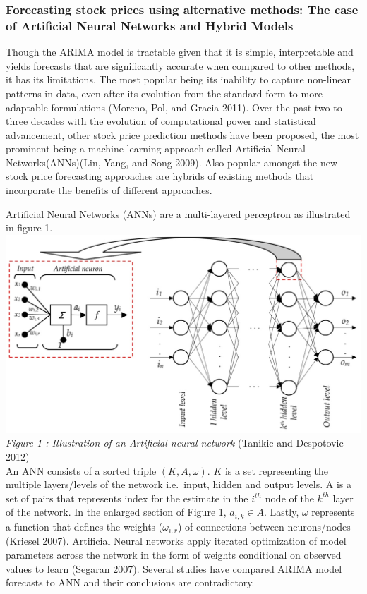 \documentclass[12pt,a4paper]{article}
\numberwithin{equation}{section}
\numberwithin{figure}{section}
\numberwithin{table}{section}
\begin{document}
\subsubsection{Forecasting stock prices using alternative methods: The
case of Artificial Neural Networks and Hybrid
Models}\label{forecasting-stock-prices-using-alternative-methods-the-case-of-artificial-neural-networks-and-hybrid-models}

Though the ARIMA model is tractable given that it is simple,
interpretable and yields forecasts that are significantly accurate when
compared to other methods, it has its limitations. The most popular
being its inability to capture non-linear patterns in data, even after
its evolution from the standard form to more adaptable formulations
(Moreno, Pol, and Gracia 2011). Over the past two to three decades with
the evolution of computational power and statistical advancement, other
stock price prediction methods have been proposed, the most prominent
being a machine learning approach called Artificial Neural
Networks(ANNs)(Lin, Yang, and Song 2009). Also popular amongst the new
stock price forecasting approaches are hybrids of existing methods that
incorporate the benefits of different approaches.

Artificial Neural Networks (ANNs) are a multi-layered perceptron as
illustrated in figure 1.\\
\includegraphics{ANN.png}\\
\emph{Figure 1 : Illustration of an Artificial neural network} (Tanikic
and Despotovic 2012)\\
An ANN consists of a sorted triple \((K, A, \omega)\). \(K\) is a set
representing the multiple layers/levels of the network i.e.~input,
hidden and output levels. A is a set of pairs that represents index for
the estimate in the \(i^{th}\) node of the \(k^{th}\) layer of the
network. In the enlarged section of Figure 1, \(a_{i,k} \in A\). Lastly,
\(\omega\) represents a function that defines the weights
(\(\omega_{i,r}\)) of connections between neurons/nodes (Kriesel 2007).
Artificial Neural networks apply iterated optimization of model
parameters across the network in the form of weights conditional on
observed values to learn (Segaran 2007). Several studies have compared
ARIMA model forecasts to ANN and their conclusions are contradictory.
\end{document}

